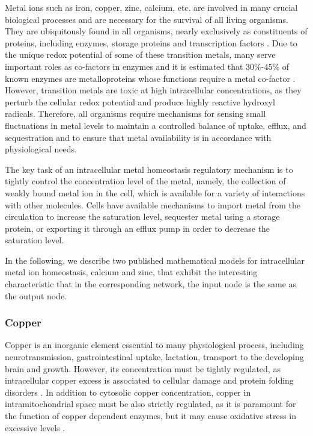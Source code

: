 \documentclass[a4paper,fleqn]{cas-dc}
\begin{document}
Metal ions such as iron, copper, zinc, calcium, etc. are involved in many crucial biological processes and are necessary for the survival of all living organisms. 
They are ubiquitously found in all organisms, nearly exclusively as constituents of proteins, including enzymes, storage proteins and transcription factors \cite{hood2012}.
Due to the unique redox potential of some of these transition metals, many serve important roles as co-factors in enzymes and it is estimated that 30\%-45\% of known enzymes are metalloproteins whose functions require a metal co-factor \cite{klein2011}. 
However, transition metals are toxic at high intracellular concentrations, as they perturb the cellular redox potential and produce highly reactive hydroxyl radicals. 
Therefore, all organisms require mechanisms for sensing small fluctuations in metal levels to maintain a controlled balance of uptake, efflux, and sequestration and to ensure that metal availability is in accordance with physiological needs.

The key task of an intracellular metal homeostasis regulatory mechanism is to tightly control the concentration level of the metal, namely, the collection of weakly bound metal ion in the cell, which is available for a variety of interactions with other molecules.
Cells have available mechanisms to import metal from the circulation to increase the saturation level, sequester metal using a storage protein, or exporting it through an efflux pump in order to decrease the saturation level.

In the following, we describe two published mathematical models for intracellular metal ion homeostasis, calcium and zinc, that exhibit the interesting characteristic that in the corresponding network, the input node is the same as the output node.

\subsubsection{Copper}

Copper is an inorganic element essential to many physiological process, including neurotransmission, gastrointestinal uptake, lactation, transport to the developing brain  and growth. However, its concentration must be tightly regulated, as intracellular copper excess is associated to cellular damage and protein folding disorders \cite{lutsenko2007b, kaplan2016}.
In addition to cytosolic copper concentration, copper in intramitochondrial space must be also strictly regulated, as it is paramount for the function of copper dependent enzymes, but it may cause oxidative stress in excessive levels \cite{baker2017}.
\end{document}
